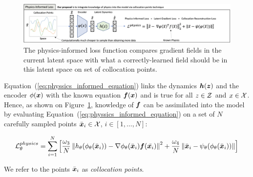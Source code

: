 \begin{figure}
    \centering
    \includegraphics[width=\textwidth]{figures/abstract_physics_informed.png}
    \caption{The physics-informed loss function compares gradient fields in the current latent space with what a correctly-learned field should be in this latent space on set of collocation points.}
    \label{fig:physics_informed_loss}
\end{figure}

Equation~(\ref{eq:physsics_informed_equation}) links the dynamics $\boldsymbol{h}(\boldsymbol{z})$ and the encoder $\phi(\boldsymbol{x})$ with the known equation $\boldsymbol{f}(\boldsymbol{x})$ and is true for all $z \in \operatorname{\mathcal{Z}}$ and $x \in \operatorname{\mathcal{X}}$. Hence, as shown on Figure~\ref{fig:physics_informed_loss}, knowledge of $\boldsymbol{f}$ can be assimilated into the model by evaluating Equation~(\ref{eq:physsics_informed_equation}) on a set of $N$ carefully sampled points $\bar{\boldsymbol{x}}_i \in \operatorname{\mathcal{X}}$, $i \in [1, \dots, N]$:

\begin{equation}
    \label{eq:loss_physics_informed}
    \operatorname{\mathcal{L}}^{physics}_\theta = \sum_{i = 1}^N \left[\frac{\omega_3}{N}\left\|h_\theta(\phi_\theta(\bar{\boldsymbol{x}}_i)) - \nabla \phi_\theta(\bar{\boldsymbol{x}}_i) \boldsymbol{f}(\bar{\boldsymbol{x}_i})\right\|^2 + \frac{\omega_4}{N}\left\|\bar{\boldsymbol{x}}_i - \psi_\theta(\phi_\theta(\bar{\boldsymbol{x}}_i))\right\|\right]
\end{equation}

We refer to the points $\bar{\boldsymbol{x}}_i$ as \textit{collocation points}.

